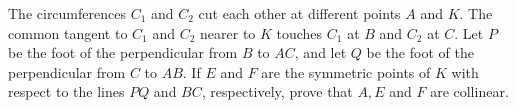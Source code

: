 The circumferences $C_1$ and $C_2$ cut each other at different points $A$ and $K$. The common tangent to $C_1$ and $C_2$ nearer to $K$ touches $C_1$ at $B$ and $C_2$ at $C$. Let $P$ be the foot of the perpendicular from $B$ to $AC$,  and let $Q$ be the foot of the perpendicular from $C$ to $AB$. If $E$ and $F$ are the symmetric points of $K$ with respect  to the lines $PQ$ and $BC$,  respectively, prove that $A, E$ and $F$ are collinear.